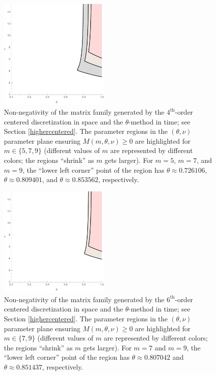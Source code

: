 \documentclass[a4paper]{article}
\newcommand{\te}{\theta}
\begin{document}
\begin{figure}
\begin{center}
\includegraphics[width=0.48\textwidth]{fig_5stencilm579.pdf}
\caption{Non-negativity of the matrix family generated by the $4^\text{th}$-order centered discretization in space and the $\theta$-method in time; see Section \ref{highercentered}. The parameter regions in the $(\te,\nu)$ parameter plane ensuring $M(m,\te,\nu)\ge 0$ are highlighted for $m\in\{5, 7, 9\}$ (different values of $m$ are represented by different colors; the regions ``shrink'' as $m$ gets larger). For $m=5$, $m=7$, and $m=9$, the ``lower left corner'' point of the region has $\theta\approx 0.726106$, $\theta\approx 0.809401$, and $\theta\approx 0.853562$, respectively.}\label{fig_5stencilm579}
\end{center}
\end{figure}

\begin{figure}
\begin{center}
\includegraphics[width=0.48\textwidth]{fig_7stencilm79.pdf}
\caption{Non-negativity of the matrix family generated by the $6^\text{th}$-order centered discretization in space and the $\theta$-method in time; see Section \ref{highercentered}. The parameter regions in the $(\te,\nu)$ parameter plane ensuring $M(m,\te,\nu)\ge 0$ are highlighted for $m\in\{7, 9\}$ (different values of $m$ are represented by different colors; the regions ``shrink'' as $m$ gets larger). For $m=7$ and $m=9$, the ``lower left corner'' point of the region has $\theta\approx 0.807042$ and $\theta\approx 0.851437$, respectively.}\label{fig_7stencilm79}
\end{center}
\end{figure}
\end{document}
